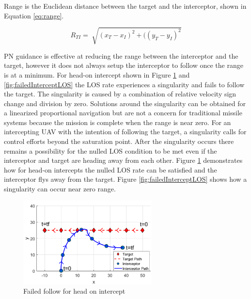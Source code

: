 \documentclass[conference]{IEEEtran}
\begin{document}
Range is the Euclidean distance between the target and the interceptor, shown in Equation \ref{eq:range}. 

\begin{equation} \label{eq:range}
R_{TI} =\sqrt[]{(x_T - x_I)^2+((y_T - y_I)^2}
\end{equation}


 


PN guidance is effective at reducing the range between the interceptor and the target, however it does not always setup the interceptor to follow once the range is at a minimum. For head-on intercept shown in Figure \ref{fig:failedIntercept} and \ref{fig:failedInterceptLOS} the LOS rate experiences a singularity and fails to follow the target. The singularity is caused by a combination of relative velocity sign change and division by zero. Solutions around the singularity can be obtained for a linearized proportional navigation \cite{singularitySolution} but are not a concern for traditional missile systems because the mission is complete when the range is near zero. For an intercepting UAV with the intention of following the target, a singularity  calls for control efforts beyond the saturation point. After the singularity occurs there remains a possibility for the nulled LOS condition to be met even if the interceptor and target are heading away from each other. Figure \ref{fig:failedIntercept} demonstrates how for head-on intercepts the nulled LOS rate can be satisfied and the interceptor flys away from the target. Figure \ref{fig:failedInterceptLOS} shows how a singularity can occur near zero range.




\begin{figure}[H]
	\centering
	\includegraphics[width=7cm] {failedHeadOn}
	\caption{Failed follow for head on intercept}
	\label{fig:failedIntercept}
	\hspace*{0mm}
\end{figure}
\end{document}
